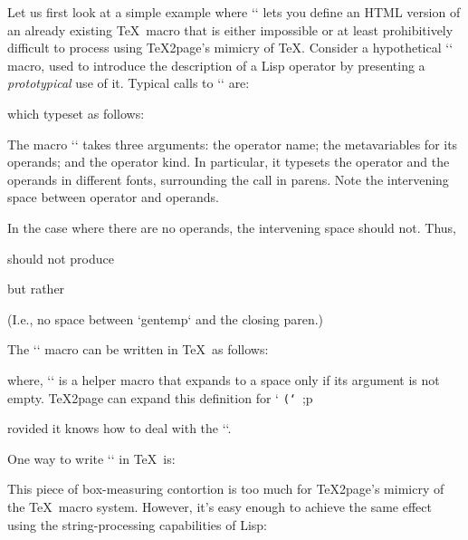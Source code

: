 Let us first look at a simple example where
`\eval` lets you define an HTML version of an already
existing \TeX\ macro that is either impossible or at
least prohibitively difficult  to process using
\TeX2page’s  mimicry of \TeX.  Consider a hypothetical
`\proto` macro, used to introduce the description of
a Lisp operator by presenting a {\em prototypical}
use of it.
Typical calls to `\proto` are:

\begintt
{}
\endtt
%
which typeset as follows:

\quote
{}
\endquote
The macro `\proto` takes three arguments: the
operator name; the metavariables for its operands;
and the operator kind.  In particular, it typesets
the operator and the operands in different fonts,
surrounding the call in parens.  Note the
intervening space between operator and operands.

In the case where there are no operands, the intervening
space should not.  Thus,

\begintt
{}
\endtt
%
should not produce

\quote
{}
\endquote
but rather

\quote
{}
\endquote
(I.e., no space between `gentemp` and the
closing paren.)


The `\proto` macro can be written
in \TeX\ as follows:

\begintt
\def\proto#1#2#3{\noindent
  \hbox{{\tt(#1}\spaceifnotempty{#2}{\it#2}{\tt)}%
    \qquad ;#3}\par}
\endtt
%
where, `\spaceifnotempty` is a helper macro
that expands to a space only if its argument is
not empty.  \TeX2page can expand this definition
for `\proto`, provided it knows how to deal
with the `\spaceifnotempty`.

One way to write `\spaceifnotempty` in \TeX\
is:

\begintt
\newdimen\templen
\newbox\tempbox

\def\spaceifnotempty#1{%
  \setbox\tempbox\hbox{#1}%
  \templen\wd\tempbox
  \ifdim\templen>0pt{\ }\fi}
\endtt
%
This piece of box-measuring contortion is
too much for \TeX2page’s mimicry of the \TeX\ macro
system.  However, it’s easy enough to  achieve the
same effect using the string-processing capabilities
of Lisp:

